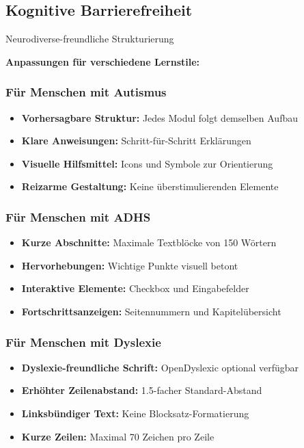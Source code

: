 \subsection{Kognitive Barrierefreiheit}

\begin{ctmmOrangeBox}{Neurodiverse-freundliche Strukturierung}

\textbf{Anpassungen für verschiedene Lernstile:}

\subsubsection{Für Menschen mit Autismus}
\begin{itemize}
  \item \textbf{Vorhersagbare Struktur:} Jedes Modul folgt demselben Aufbau
  \item \textbf{Klare Anweisungen:} Schritt-für-Schritt Erklärungen
  \item \textbf{Visuelle Hilfsmittel:} Icons und Symbole zur Orientierung
  \item \textbf{Reizarme Gestaltung:} Keine überstimulierenden Elemente
\end{itemize}

\subsubsection{Für Menschen mit ADHS}
\begin{itemize}
  \item \textbf{Kurze Abschnitte:} Maximale Textblöcke von 150 Wörtern
  \item \textbf{Hervorhebungen:} Wichtige Punkte visuell betont
  \item \textbf{Interaktive Elemente:} Checkbox und Eingabefelder
  \item \textbf{Fortschrittsanzeigen:} Seitennummern und Kapitelübersicht
\end{itemize}

\subsubsection{Für Menschen mit Dyslexie}
\begin{itemize}
  \item \textbf{Dyslexie-freundliche Schrift:} OpenDyslexic optional verfügbar
  \item \textbf{Erhöhter Zeilenabstand:} 1.5-facher Standard-Abstand
  \item \textbf{Linksbündiger Text:} Keine Blocksatz-Formatierung
  \item \textbf{Kurze Zeilen:} Maximal 70 Zeichen pro Zeile
\end{itemize}

\end{ctmmOrangeBox}

